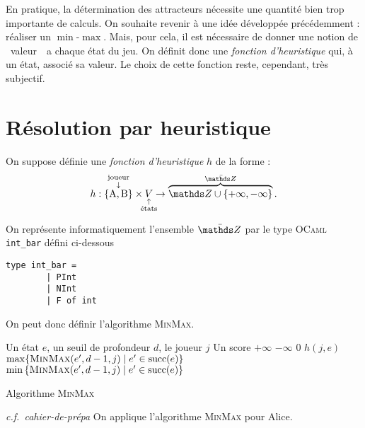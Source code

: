 En pratique, la détermination des attracteurs nécessite une quantité bien trop importante de calculs. On souhaite revenir à une idée développée précédemment : réaliser un $\min$-$\max$. Mais, pour cela, il est nécessaire de donner une notion de \guillemotleft~valeur~\guillemotright\ a chaque état du jeu. On définit donc une \textit{fonction d'heuristique} qui, à un état, associé sa valeur. Le choix de cette fonction reste, cependant, très subjectif.

\section{Résolution par heuristique}

On suppose définie une \textit{fonction d'heuristique} $h$ de la forme : \[
	h : \overset{\mathclap{\substack{\text{joueur}\\\downarrow}}}{\{\mathrm{A},\mathrm{B}\}}  \times \underset{\mathclap{\substack{\uparrow\\\text{états}}}}{V} \to \overbrace{\Z \cup \{+\infty,-\infty\}}^{\bar{\Z}}
.\]

On représente informatiquement l'ensemble $\bar{\Z}$\/ par le type \textsc{OCaml} \texttt{int\_bar} défini ci-dessous
\begin{lstlisting}[language=caml,caption={Type \texttt{int\_bar} représentant un élément l'ensemble $\bar{\Z}$~}]
	type int_bar =
		| PInt
		| NInt
		| F of int
\end{lstlisting}

On peut donc définir l'algorithme \textsc{MinMax}.
\begin{algorithm}[H]
	\centering
	\begin{algorithmic}[1]
		\Entree Un état $e$, un seuil de profondeur $d$, le joueur $j$
		\Sortie Un score
			 \State\Return $+\infty$
			 \State\Return $-\infty$
			\Else \State\Return $0$
			\EndIf
			\State\Return $h(j, e)$
		\Else
				\State\Return $\max\{\textsc{MinMax}(e', d-1, j) \mid e' \in \mathrm{succ}(e)\}$
			\Else
				\State\Return $\min\,\{\textsc{MinMax}(e', d-1, j) \mid e' \in \mathrm{succ}(e)\}$
			\EndIf
		\EndIf
	\end{algorithmic}
	\caption{Algorithme \textsc{MinMax}}
\end{algorithm}

\begin{exm}
	\textit{c.f.\ cahier-de-prépa} On applique l'algorithme \textsc{MinMax} pour Alice.
\end{exm}

